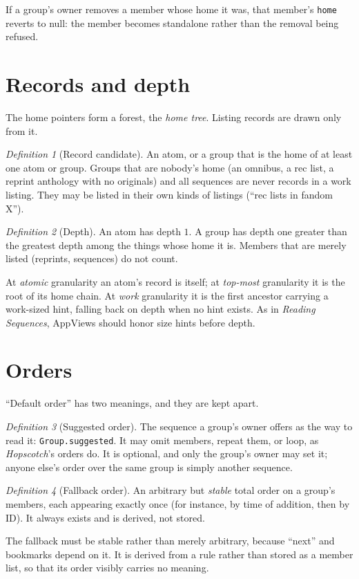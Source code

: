 \documentclass{amsart}
\theoremstyle{remark}
\newtheorem{defn}{Definition}
\begin{document}
If a group's owner removes a member whose home it was, that member's \lstinline|home| reverts to null: the member becomes standalone rather than the removal being refused.

\section{Records and depth}
The home pointers form a forest, the \emph{home tree}. Listing records are drawn only from it.

\begin{defn}[Record candidate]An atom, or a group that is the home of at least one atom or group. Groups that are nobody's home (an omnibus, a rec list, a reprint anthology with no originals) and all sequences are never records in a work listing. They may be listed in their own kinds of listings (``rec lists in fandom X'').\end{defn}

\begin{defn}[Depth]An atom has depth $1$. A group has depth one greater than the greatest depth among the things whose home it is. Members that are merely listed (reprints, sequences) do not count.\end{defn}

At \emph{atomic} granularity an atom's record is itself; at \emph{top-most} granularity it is the root of its home chain. At \emph{work} granularity it is the first ancestor carrying a work-sized hint, falling back on depth when no hint exists. As in \emph{Reading Sequences}, AppViews should honor size hints before depth.

\section{Orders}\label{sec:orders}
``Default order'' has two meanings, and they are kept apart.
\begin{defn}[Suggested order]The sequence a group's owner offers as the way to read it: \lstinline|Group.suggested|. It may omit members, repeat them, or loop, as \emph{Hopscotch}'s orders do. It is optional, and only the group's owner may set it; anyone else's order over the same group is simply another sequence.\end{defn}
\begin{defn}[Fallback order]An arbitrary but \emph{stable} total order on a group's members, each appearing exactly once (for instance, by time of addition, then by ID). It always exists and is derived, not stored.\end{defn}
The fallback must be stable rather than merely arbitrary, because ``next'' and bookmarks depend on it. It is derived from a rule rather than stored as a member list, so that its order visibly carries no meaning.
\end{document}
